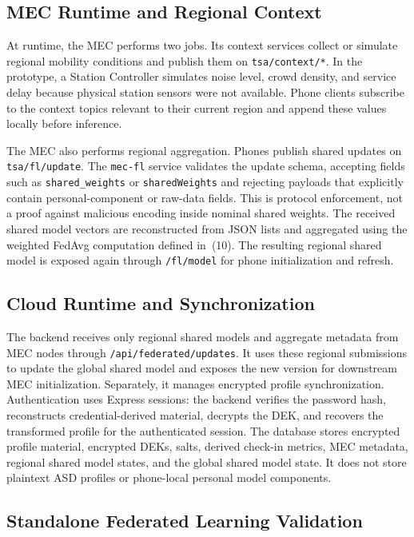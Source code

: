 \documentclass[lettersize,journal]{IEEEtran}
\begin{document}
\subsection{MEC Runtime and Regional Context}

At runtime, the MEC performs two jobs. Its context services collect or
simulate regional mobility conditions and publish them on
\texttt{tsa/context/*}. In the prototype, a Station Controller simulates
noise level, crowd density, and service delay because physical station
sensors were not available. Phone clients subscribe to the context
topics relevant to their current region and append these values locally
before inference.

The MEC also performs regional aggregation. Phones publish shared
updates on \texttt{tsa/fl/update}. The \texttt{mec-fl} service validates
the update schema, accepting fields such as \texttt{shared\_weights} or
\texttt{sharedWeights} and rejecting payloads that explicitly contain
personal-component or raw-data fields. This is protocol enforcement, not
a proof against malicious encoding inside nominal shared weights. The
received shared model vectors are reconstructed from JSON lists and
aggregated using the weighted FedAvg computation defined in~(10). The
resulting regional shared model is exposed again through
\texttt{/fl/model} for phone initialization and refresh.

\subsection{Cloud Runtime and Synchronization}

The backend receives only regional shared models and aggregate metadata
from MEC nodes through \texttt{/api/federated/updates}. It uses these
regional submissions to update the global shared model and exposes the
new version for downstream MEC initialization. Separately, it manages
encrypted profile synchronization. Authentication uses Express sessions:
the backend verifies the password hash, reconstructs credential-derived
material, decrypts the DEK, and recovers the transformed profile for the
authenticated session. The database stores encrypted profile material,
encrypted DEKs, salts, derived check-in metrics, MEC metadata, regional
shared model states, and the global shared model state. It does not
store plaintext ASD profiles or phone-local personal model components.

\subsection{Standalone Federated Learning Validation}
\end{document}
